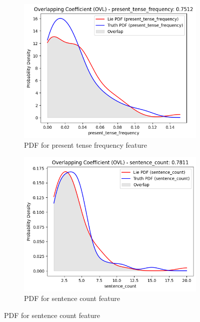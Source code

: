 \documentclass[12pt]{article}
\begin{document}
\begin{figure}[H]
    \begin{subfigure}{0.5\textwidth}
        \includegraphics[width=\textwidth]{Figures/present_tense_frequency.png}
        \caption{PDF for present tense frequency feature}
        \label{fig:5}
    \end{subfigure}%
    \begin{subfigure}{0.5\textwidth}
        \includegraphics[width=\textwidth]{Figures/sentence_count.png}
        \caption{PDF for sentence count feature}
        \label{fig:6}
    \end{subfigure}
\end{figure}
\end{document}
